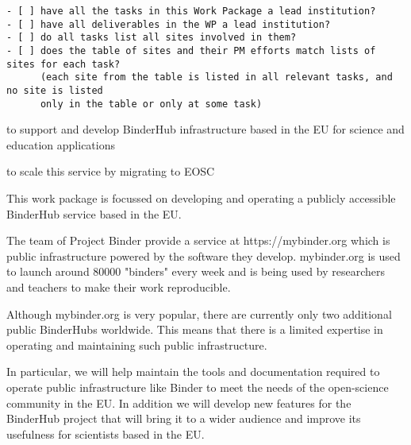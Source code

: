 \begin{draft}
\begin{verbatim}
- [ ] have all the tasks in this Work Package a lead institution?
- [ ] have all deliverables in the WP a lead institution?
- [ ] do all tasks list all sites involved in them?
- [ ] does the table of sites and their PM efforts match lists of sites for each task?
      (each site from the table is listed in all relevant tasks, and no site is listed
      only in the table or only at some task)
\end{verbatim}
\end{draft}

\begin{workpackage}[id=eosc,wphases=0-48,swsites,
  title=Services and EOSC Integration,
  short=EOSC,
  lead=SRL,
  EGIRM=21,
  EPRM=6,
  SRLRM=18,
  UPSUDRM=4,
  WTTRM=15,
  XFELRM=6,
  EPRM=10,
]
\begin{wpobjectives}
 \begin{compactitem}
   \item to support and develop BinderHub infrastructure based in the EU for
     science and education applications
   \item to scale this service by migrating to EOSC
 \end{compactitem}
\end{wpobjectives}

\begin{wpdescription}

This work package is focussed on developing and operating a publicly accessible
BinderHub service based in the EU.

The team of Project Binder provide a service at https://mybinder.org
which is public infrastructure powered by the software they develop.
mybinder.org is used to launch around 80000 "binders" every week and is
being used by researchers and teachers to make their work reproducible.

Although mybinder.org is very popular, there are currently only two
additional public BinderHubs worldwide. This means that there is a limited
expertise in operating and maintaining such public infrastructure.

In particular, we will help maintain the tools and documentation required
to operate public infrastructure like Binder to meet the needs of the
open-science community in the EU. In addition we will develop new features
for the BinderHub project that will bring it to a wider audience and improve
its usefulness for scientists based in the EU.


\end{wpdescription}
\end{workpackage}
